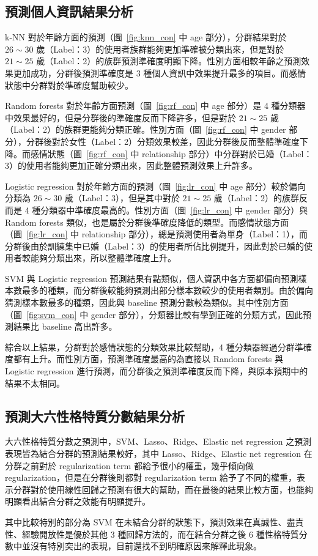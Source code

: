 \subsection{預測個人資訊結果分析}
{
k-NN 對於年齡方面的預測（圖~\ref{fig:knn_con} 中 age 部分），分群結果對於 $26\sim30$ 歲（Label：3）的使用者族群能夠更加準確被分類出來，但是對於 $21\sim25$ 歲（Label：2）的族群預測準確度明顯下降。性別方面相較年齡之預測效果更加成功，分群後預測準確度是 3 種個人資訊中效果提升最多的項目。而感情狀態中分群對於準確度幫助較少。\par

Random forests 對於年齡方面預測（圖~\ref{fig:rf_con} 中 age 部分）是 4 種分類器中效果最好的，但是分群後的準確度反而下降許多，但是對於 $21\sim25$ 歲（Label：2）的族群更能夠分類正確。性別方面（圖~\ref{fig:rf_con} 中 gender 部分），分群後對於女性（Label：2）分類效果較差，因此分群後反而整體準確度下降。而感情狀態（圖~\ref{fig:rf_con} 中 relationship 部分）中分群對於已婚（Label：3）的使用者能夠更加正確分類出來，因此整體預測效果上升許多。\par

Logistic regression 對於年齡方面的預測（圖~\ref{fig:lr_con} 中 age 部分）較於偏向分類為 $26\sim30$ 歲（Label：3），但是其中對於 $21\sim25$ 歲（Label：2）的族群反而是 4 種分類器中準確度最高的。性別方面（圖~\ref{fig:lr_con} 中 gender 部分）與 Random forests 類似，也是屬於分群後準確度降低的類型。而感情狀態方面（圖~\ref{fig:lr_con} 中 relationship 部分），總是預測使用者為單身（Label：1），而分群後由於訓練集中已婚（Label：3）的使用者所佔比例提升，因此對於已婚的使用者較能夠分類出來，所以整體準確度上升。\par

SVM 與 Logistic regression 預測結果有點類似，個人資訊中各方面都偏向預測樣本數最多的種類，而分群後較能夠預測出部分樣本數較少的使用者類別。由於偏向猜測樣本數最多的種類，因此與 baseline 預測分數較為類似。其中性別方面（圖~\ref{fig:svm_con} 中 gender 部分），分類器比較有學到正確的分類方式，因此預測結果比 baseline 高出許多。\par

綜合以上結果，分群對於感情狀態的分類效果比較幫助，4 種分類器經過分群準確度都有上升。而性別方面，預測準確度最高的為直接以 Random forests 與 Logistic regression 進行預測，而分群後之預測準確度反而下降，與原本預期中的結果不太相同。
}

\subsection{預測大六性格特質分數結果分析}
{
大六性格特質分數之預測中，SVM、Lasso、Ridge、Elastic net regression 之預測表現皆為結合分群的預測結果較好，其中 Lasso、Ridge、Elastic net regression 在分群之前對於 regularization term 都給予很小的權重，幾乎傾向做 regularization，但是在分群後則都對 regularization term 給予了不同的權重，表示分群對於使用線性回歸之預測有很大的幫助，而在最後的結果比較方面，也能夠明顯看出結合分群之效能有明顯提升。\par

其中比較特別的部分為 SVM 在未結合分群的狀態下，預測效果在真誠性、盡責性、經驗開放性是優於其他 3 種回歸方法的，而在結合分群之後 6 種性格特質分數中並沒有特別突出的表現，目前還找不到明確原因來解釋此現象。
}